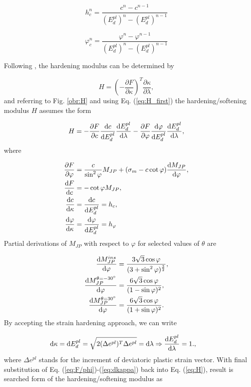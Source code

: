 \begin{equation}\label{eq:h_c}
	h_c^n = \dfrac{c^n-c^{n-1}}{(E_d^{pl})^{n}-(E_d^{pl})^{n-1}}
\end{equation}

\begin{equation}\label{eq:h_phi}
 	\varphi_c^n = \dfrac{\varphi^n-\varphi^{n-1}}{(E_d^{pl})^{n}-(E_d^{pl})^{n-1}}
\end{equation}

Following \cite{geofem}, the hardening modulus can be determined by

\begin{equation}\label{eq:H_first}
	H = \left(-\dfrac{\partial F}{\partial \kappa}\right)^T \dfrac{\partial \kappa}{\partial \lambda},
\end{equation}
and referring to Fig. \ref{obr:H} and using Eq. (\ref{eq:H_first}) the hardening/softening modulus $H$ assumes the form 

\begin{equation}\label{eq:H}
	H = - \pdv{F}{c} \dv{c}{E_d^{pl}} \dv{E_d^{pl}}{\lambda} - \pdv{F}{\varphi} \dv{\varphi}{E_d^{pl}} \dv{E_d^{pl}}{\lambda},
\end{equation}
where

\begin{align}
\pdv{F}{\varphi}& = \dfrac{c}{\sin^2\varphi} M_{JP} + (\sigma_m - c\cot \varphi) \dv{M_{JP}}{\varphi},\label{eq:F/phi}\\
\dv{F}{c}& = - \cot \varphi M_{JP},\\
\dv{c}{\kappa}& = \dv{c}{E_d^{pl}} = h_c,\\
\dv{\varphi}{\kappa}& = \dv{\varphi}{E_d^{pl}} = h_\varphi
\end{align}
Partial derivations of $M_{JP}$ with respect to $\varphi$ for selected values of $\theta$ are

\begin{align}
	\dv{M_{JP}^{ins}}{\varphi}					& = \dfrac{3\sqrt{3}\cos \varphi}{(3 + \sin^2 \varphi)^{\frac{3}{2}}},\\
	\dv{M_{JP}^{\theta = \ang{-30}}}{\varphi}	& = \dfrac{6\sqrt{3}\cos \varphi}{(1-\sin \varphi)^2},\\
	\dv{M_{JP}^{\theta = \ang{30}}}{\varphi}	& = \dfrac{6\sqrt{3}\cos \varphi}{(1+\sin \varphi)^2}.
\end{align}
By accepting the strain hardening approach, we can write

\begin{align}
	\dd\kappa& = \dd E_d^{pl} = \sqrt{2(\Delta e^{pl})^T \Delta e^{pl} } = \dd \lambda \Rightarrow \dv{E_d^{pl}}{\lambda} = 1.\label{eq:dkappa},
\end{align}
where  $\Delta e^{pl}$ stands for the increment of deviatoric plastic strain vector. With final substitution of Eq. (\ref{eq:F/phi})-(\ref{eq:dkappa}) back into Eq. (\ref{eq:H}), result is searched form of the hardening/softening modulus as

